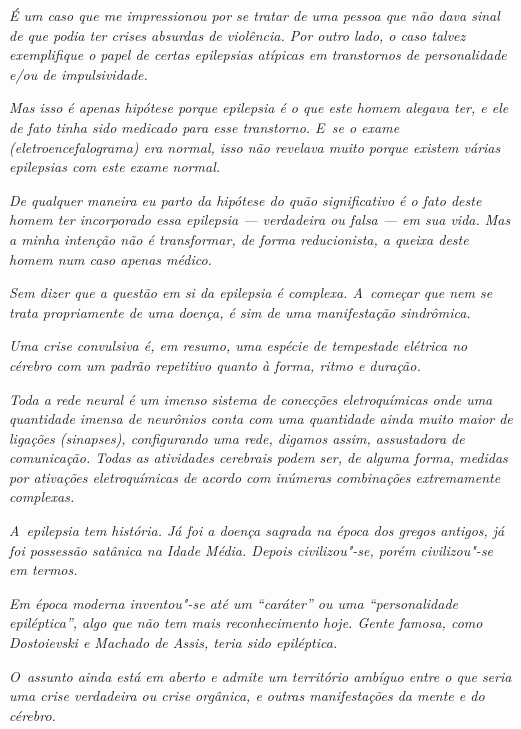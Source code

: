 \begin{center}\asterisc{}\end{center}


\emph{É um caso que me impressionou por se tratar de uma pessoa que não
dava sinal de que podia ter crises absurdas de violência. Por outro
lado, o caso talvez exemplifique o papel de certas epilepsias atípicas
em transtornos de personalidade e/ou de impulsividade.}~

\emph{Mas isso é apenas hipótese porque epilepsia é o que este homem
alegava ter, e ele de fato tinha sido medicado para esse transtorno. E~se o exame (eletroencefalograma) era normal, isso não revelava muito
porque existem várias epilepsias com este exame normal.}~

\emph{De qualquer maneira eu parto da hipótese do quão significativo é o
fato deste homem ter incorporado essa epilepsia --- verdadeira ou falsa
--- em sua vida. Mas a minha intenção não é transformar, de forma
reducionista, a queixa deste homem num caso apenas médico.}~

\emph{Sem dizer que a questão em si da epilepsia é complexa. A~começar
que nem se trata propriamente de uma doença, é sim de uma manifestação
sindrômica.}~

\emph{Uma crise convulsiva é, em resumo, uma espécie de tempestade
elétrica no cérebro com um padrão repetitivo quanto à forma, ritmo e
duração.}

\emph{Toda a rede neural é um imenso sistema de conecções eletroquímicas
onde uma quantidade imensa de neurônios conta com uma quantidade ainda
muito maior de ligações (sinapses), configurando uma rede, digamos
assim, assustadora de comunicação. Todas as atividades cerebrais podem
ser, de alguma forma, medidas por ativações eletroquímicas de acordo com
inúmeras combinações extremamente complexas.}~

\emph{A~epilepsia tem história. Já foi a doença sagrada na época dos
gregos antigos, já foi possessão satânica na Idade Média. Depois
civilizou"-se, porém civilizou"-se em termos.}~

\emph{Em época moderna inventou"-se até um ``caráter'' ou uma
``personalidade epiléptica'', algo que não tem mais reconhecimento hoje.
Gente famosa, como Dostoievski e Machado de Assis, teria sido
epiléptica.}~

\emph{O~assunto ainda está em aberto e admite um território ambíguo
entre o que seria uma crise verdadeira ou crise orgânica, e outras
manifestações da mente e do cérebro.}~

